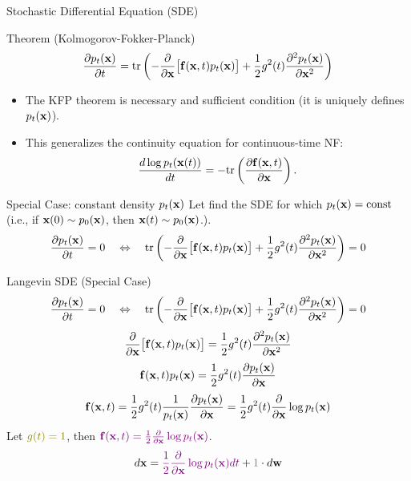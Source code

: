 \documentclass{beamer}
\begin{document}
\begin{frame}{Stochastic Differential Equation (SDE)}
	\begin{block}{Theorem (Kolmogorov-Fokker-Planck)}
		\vspace{-0.2cm}
		\[
			\frac{\partial p_t(\mathbf{x})}{\partial t} = \text{tr}\left( - \frac{\partial}{\partial \mathbf{x}} \bigl[ \mathbf{f}(\mathbf{x}, t) p_t(\mathbf{x})\bigr] + \frac{1}{2} g^2(t) \frac{\partial^2 p_t(\mathbf{x})}{\partial \mathbf{x}^2}\right)
		\]
		\vspace{-0.2cm}
	\end{block}
	\begin{itemize}
		\item The KFP theorem is necessary and sufficient condition (it is uniquely defines $p_t(\mathbf{x})$).
		\item This generalizes the continuity equation for continuous-time NF:
		\[
			\frac{d \log p_t(\mathbf{x}(t))}{d t} = - \text{tr} \left( \frac{\partial \mathbf{f}(\mathbf{x}, t)}{\partial \mathbf{x}} \right).
		\]
	\end{itemize}
	\eqpause
	\vspace{-0.3cm}
	\begin{block}{Special Case: constant density $p_t(\mathbf{x})$}
		Let find the SDE for which $p_t(\mathbf{x}) = \text{const}$ (i.e., if $\mathbf{x}(0) \sim p_0(\mathbf{x})$, then $\mathbf{x}(t) \sim p_0(\mathbf{x})$.).
		\eqpause
		\[
			\frac{\partial p_t(\mathbf{x})}{\partial t} = 0 \quad \Leftrightarrow \quad \text{tr}\left( - \frac{\partial}{\partial \mathbf{x}} \bigl[ \mathbf{f}(\mathbf{x}, t) p_t(\mathbf{x})\bigr] + \frac{1}{2} g^2(t) \frac{\partial^2 p_t(\mathbf{x})}{\partial \mathbf{x}^2}\right) = 0
		\]
	\end{block}
\end{frame}
\begin{frame}{Langevin SDE (Special Case)}
	\[
		\frac{\partial p_t(\mathbf{x})}{\partial t} = 0 \quad \Leftrightarrow \quad \text{tr}\left( - \frac{\partial}{\partial \mathbf{x}} \bigl[ \mathbf{f}(\mathbf{x}, t) p_t(\mathbf{x})\bigr] + \frac{1}{2} g^2(t) \frac{\partial^2 p_t(\mathbf{x})}{\partial \mathbf{x}^2}\right) = 0
	\]
	\vspace{-0.3cm}
	\eqpause
	\[
		\frac{\partial}{\partial \mathbf{x}} \bigl[ \mathbf{f}(\mathbf{x}, t) p_t(\mathbf{x})\bigr] = \frac{1}{2} g^2(t) \frac{\partial^2 p_t(\mathbf{x})}{\partial \mathbf{x}^2}
	\]
	\eqpause
	\[
		\mathbf{f}(\mathbf{x}, t) p_t(\mathbf{x}) = \frac{1}{2} g^2(t) \frac{\partial p_t(\mathbf{x})}{\partial \mathbf{x}}
	\]
	\eqpause
	\[
		\mathbf{f}(\mathbf{x}, t) = \frac{1}{2} g^2(t) \frac{1}{p_t(\mathbf{x})}\frac{\partial p_t(\mathbf{x})}{\partial \mathbf{x}} = \frac{1}{2} g^2(t) \frac{\partial}{\partial \mathbf{x}} \log p_t(\mathbf{x})
	\]
	\eqpause
	Let ${\color{olive}g(t)=1}$, then ${\color{violet}\mathbf{f}(\mathbf{x}, t) = \frac{1}{2} \frac{\partial}{\partial \mathbf{x}} \log p_t(\mathbf{x})}$.
	\[
		d \bx = {\color{violet}\frac{1}{2} \frac{\partial}{\partial \bx} \log p_t(\bx) d t} + {\color{olive}1} \cdot d \bw
	\]
\end{frame}
\end{document}
